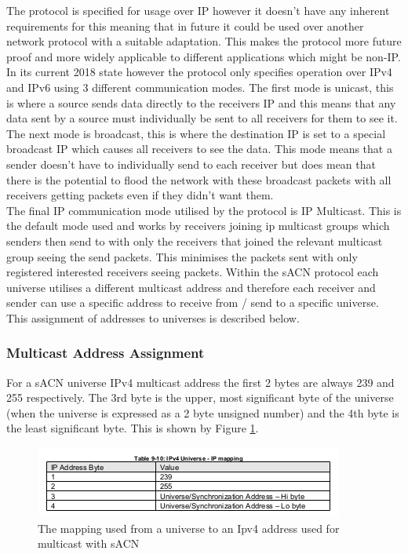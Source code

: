 \documentclass[11pt,a4paper]{report}
\begin{document}
The protocol is specified for usage over IP however it doesn't have any inherent requirements for this meaning that in future it could be used over another network protocol with a suitable adaptation. This makes the protocol more future proof and more widely applicable to different applications which might be non-IP. In its current 2018 state however the protocol only specifies operation over IPv4 and IPv6 using 3 different communication modes. The first mode is unicast, this is where a source sends data directly to the receivers IP and this means that any data sent by a source must individually be sent to all receivers for them to see it. The next mode is broadcast, this is where the destination IP is set to a special broadcast IP which causes all receivers to see the data. This mode means that a sender doesn't have to individually send to each receiver but does mean that there is the potential to flood the network with these broadcast packets with all receivers getting packets even if they didn't want them.\\

The final IP communication mode utilised by the protocol is IP Multicast. This is the default mode used and works by receivers joining ip multicast groups which senders then send to with only the receivers that joined the relevant multicast group seeing the send packets. This minimises the packets sent with only registered interested receivers seeing packets. Within the sACN protocol each universe utilises a different multicast address and therefore each receiver and sender can use a specific address to receive from / send to a specific universe. This assignment of addresses to universes is described below.\\

\subsubsection{Multicast Address Assignment}
For a sACN universe IPv4 multicast address the first 2 bytes are always 239 and 255 respectively. The 3rd byte is the upper, most significant byte of the universe (when the universe is expressed as a 2 byte unsigned number) and the 4th byte is the least significant byte. This is shown by Figure \ref{IPV4_MULTICAST_MAPPING}.

\begin{figure}[H]
\label{IPV4_MULTICAST_MAPPING}
\includegraphics[width=\textwidth]{Ipv4MulticastMapping}
\caption{The mapping used from a universe to an Ipv4 address used for multicast with sACN}
\end{figure}
\end{document}

